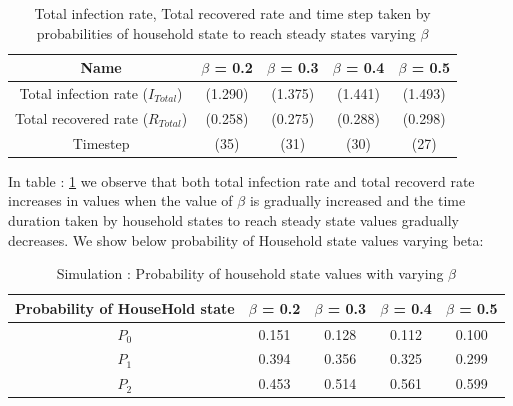 \documentclass[paper=a4, fontsize=11pt, twoside, BCOR=12mm, parskip=full, listof=totoc]{scrreprt}
\begin{document}
{\begin{table}[H]
	\centering 
	\caption{Total infection rate, Total recovered rate and time step taken by probabilities of household state to reach steady states varying $\beta$}
	\label{tab Total infection rate and timestep reached for Probabilities of Household to reach steady states varying beta}
	\begin{tabular}{ccccc}
	\toprule
     Name & $\beta$ = 0.2  & $\beta$ = 0.3 & $\beta$ = 0.4 & $\beta$ = 0.5 \\
     \midrule
     Total infection rate ($I_{Total}$) & (1.290) & (1.375) & (1.441) & (1.493) \\
     Total recovered rate ($R_{Total}$) & (0.258) & (0.275) & (0.288) & (0.298) \\
	 Timestep & (35) & (31) & (30) & (27) \\
	\bottomrule
	\end{tabular}
\end{table}

In table : \ref{tab Total infection rate and timestep reached for Probabilities of Household to reach steady states varying beta} we observe that both total infection rate and total recoverd rate increases in values when the value of $\beta$ is gradually increased and the time duration taken by household states to reach steady state values gradually decreases. 
We show below probability of Household state values varying beta:
\begin{table}[H]
	\centering 
	\caption{Simulation : Probability of household state values with varying $\beta$}
	\label{table Household state values varying beta}
	\begin{tabular}{ccccc}
	\toprule
     Probability of HouseHold state & $\beta$ = 0.2 & $\beta$ = 0.3  & $\beta$ = 0.4 & $\beta$ = 0.5 \\
     \midrule
	 $P_0$ & 0.151 & 0.128  & 0.112  & 0.100 \\
	 $P_1$ & 0.394 & 0.356  & 0.325  & 0.299 \\
	 $P_2$ & 0.453 & 0.514  & 0.561  & 0.599 \\
	\bottomrule
	\end{tabular}
\end{table}

}
\end{document}
